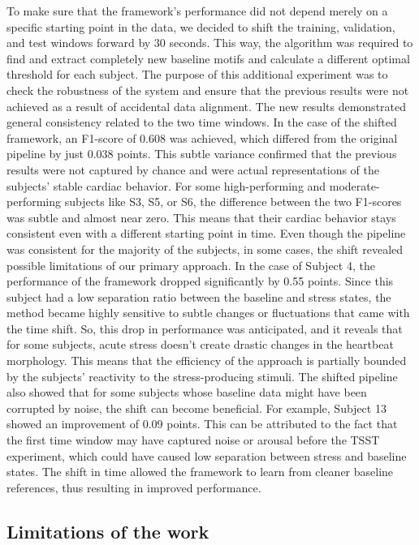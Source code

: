 \documentclass[conference,10pt]{IEEEtran}
\begin{document}
To make sure that the framework’s performance did not depend merely on a specific starting point in the data, we decided to shift the training, validation, and test windows forward by 30 seconds. This way, the algorithm was required to find and extract completely new baseline motifs and calculate a different optimal threshold for each subject. The purpose of this additional experiment was to check the robustness of the system and ensure that the previous results were not achieved as a result of accidental data alignment.
The new results demonstrated general consistency related to the two time windows. In the case of the shifted framework, an F1-score of 0.608 was achieved, which differed from the original pipeline by just 0.038 points. This subtle variance confirmed that the previous results were not captured by chance and were actual representations of the subjects’ stable cardiac behavior. For some high-performing and moderate-performing subjects like S3, S5, or S6, the difference between the two F1-scores was subtle and almost near zero. This means that their cardiac behavior stays consistent even with a different starting point in time.
Even though the pipeline was consistent for the majority of the subjects, in some cases, the shift revealed possible limitations of our primary approach. In the case of Subject 4, the performance of the framework dropped significantly by 0.55 points. Since this subject had a low separation ratio between the baseline and stress states, the method became highly sensitive to subtle changes or fluctuations that came with the time shift. So, this drop in performance was anticipated, and it reveals that for some subjects, acute stress doesn’t create drastic changes in the heartbeat morphology. This means that the efficiency of the approach is partially bounded by the subjects’ reactivity to the stress-producing stimuli.
The shifted pipeline also showed that for some subjects whose baseline data might have been corrupted by noise, the shift can become beneficial. For example, Subject 13 showed an improvement of 0.09 points. This can be attributed to the fact that the first time window may have captured noise or arousal before the TSST experiment, which could have caused low separation between stress and baseline states. The shift in time allowed the framework to learn from cleaner baseline references, thus resulting in improved performance.


\subsection{Limitations of the work}
\end{document}
